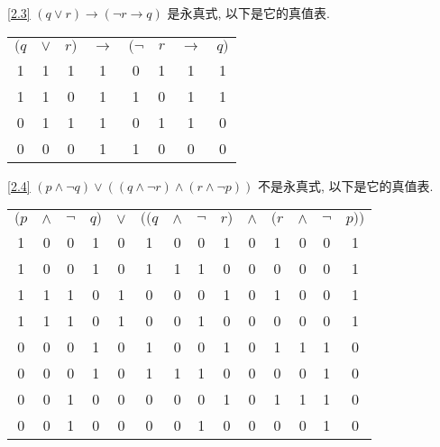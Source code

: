 \documentclass[boxes]{homework}
\begin{document}
\begin{solution}
    \ref{2.3}   $(q\lor r)\to(\lnot r\to q)$ 是永真式, 以下是它的真值表.
    \begin{center}
        \begin{tabular}{ccc|c|cccc}
            $(q$ & $\lor$ & $r)$ & $\to$ & $(\lnot$ & $r$ & $\to$ & $q)$ \\
            1    & 1      & 1    & 1     & 0        & 1   & 1     & 1    \\
            1    & 1      & 0    & 1     & 1        & 0   & 1     & 1    \\
            0    & 1      & 1    & 1     & 0        & 1   & 1     & 0    \\
            0    & 0      & 0    & 1     & 1        & 0   & 0     & 0
        \end{tabular}
    \end{center}
    \ref{2.4}   $(p\land\lnot q)\lor((q\land \lnot r)\land(r\land\lnot p))$ 不是永真式, 以下是它的真值表.
    \begin{center}
        \begin{tabular}{cccc|c|ccccccccc}
            $(p$ & $\land$ & $\lnot$ & $q)$ & $\lor$ & $((q$ & $\land$ & $\lnot$ & $r)$ & $\land$ & $(r$ & $\land$ & $\lnot$ & $p))$ \\
            1    & 0       & 0       & 1    & 0      & 1     & 0       & 0       & 1    & 0       & 1    & 0       & 0       & 1     \\
            1    & 0       & 0       & 1    & 0      & 1     & 1       & 1       & 0    & 0       & 0    & 0       & 0       & 1     \\
            1    & 1       & 1       & 0    & 1      & 0     & 0       & 0       & 1    & 0       & 1    & 0       & 0       & 1     \\
            1    & 1       & 1       & 0    & 1      & 0     & 0       & 1       & 0    & 0       & 0    & 0       & 0       & 1     \\
            0    & 0       & 0       & 1    & 0      & 1     & 0       & 0       & 1    & 0       & 1    & 1       & 1       & 0     \\
            0    & 0       & 0       & 1    & 0      & 1     & 1       & 1       & 0    & 0       & 0    & 0       & 1       & 0     \\
            0    & 0       & 1       & 0    & 0      & 0     & 0       & 0       & 1    & 0       & 1    & 1       & 1       & 0     \\
            0    & 0       & 1       & 0    & 0      & 0     & 0       & 1       & 0    & 0       & 0    & 0       & 1       & 0

\end{tabular}
\end{center}
\end{solution}
\end{document}
